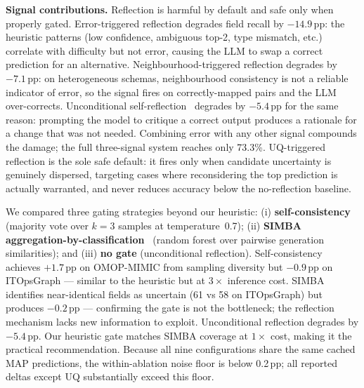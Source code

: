 \documentclass[sigconf, nonacm]{acmart}
\begin{document}
\textbf{Signal contributions.} Reflection is harmful by default and safe only when properly gated. Error-triggered reflection degrades field recall by $-14.9$\,pp: the heuristic patterns (low confidence, ambiguous top-2, type mismatch, etc.) correlate with difficulty but not error, causing the LLM to swap a correct prediction for an alternative. Neighbourhood-triggered reflection degrades by $-7.1$\,pp: on heterogeneous schemas, neighbourhood consistency is not a reliable indicator of error, so the signal fires on correctly-mapped pairs and the LLM over-corrects. Unconditional self-reflection~\cite{shinn2023reflexion} degrades by $-5.4$\,pp for the same reason: prompting the model to critique a correct output produces a rationale for a change that was not needed. Combining error with any other signal compounds the damage; the full three-signal system reaches only 73.3\%. UQ-triggered reflection is the sole safe default: it fires only when candidate uncertainty is genuinely dispersed, targeting cases where reconsidering the top prediction is actually warranted, and never reduces accuracy below the no-reflection baseline.

We compared three gating strategies beyond our heuristic: (i) \textbf{self-consistency}~\cite{wang2023selfconsistency} (majority vote over $k{=}3$ samples at temperature~0.7); (ii) \textbf{SIMBA aggregation-by-classification}~\cite{simba2025} (random forest over pairwise generation similarities); and (iii) \textbf{no gate} (unconditional reflection). Self-consistency achieves $+1.7$\,pp on OMOP-MIMIC from sampling diversity but $-0.9$\,pp on ITOpsGraph — similar to the heuristic but at $3\times$ inference cost. SIMBA identifies near-identical fields as uncertain (61 vs 58 on ITOpsGraph) but produces $-0.2$\,pp — confirming the gate is not the bottleneck; the reflection mechanism lacks new information to exploit. Unconditional reflection degrades by $-5.4$\,pp. Our heuristic gate matches SIMBA coverage at $1\times$ cost, making it the practical recommendation. Because all nine configurations share the same cached MAP predictions, the within-ablation noise floor is below 0.2\,pp; all reported deltas except UQ substantially exceed this floor.
\end{document}
